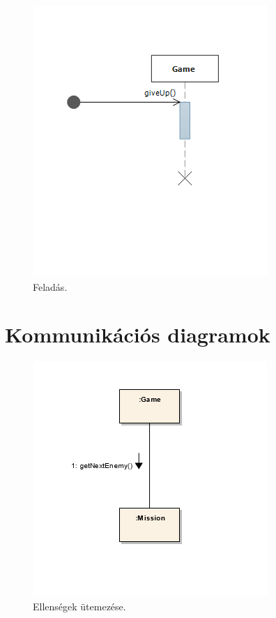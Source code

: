 \begin{figure}[H]
\begin{center}
\includegraphics{images/giving_up.png}
\caption{Feladás.}
\label{fig:giving_up}
\end{center}
\end{figure}


\pagebreak

\section{Kommunikációs diagramok}

\begin{figure}[H]
\begin{center}
\includegraphics{images/ch05/nextEnemyKomm.png}
\caption{Ellenségek ütemezése.}
\label{fig:nextEnemyKomm}
\end{center}
\end{figure}

